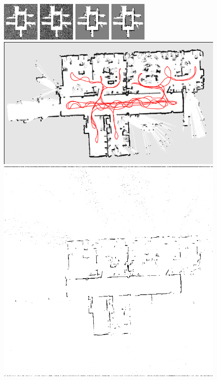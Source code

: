 \documentclass[letterpaper, 10 pt, conference]{ieeeconf} %
\begin{document}
\begin{figure}
  \includegraphics[width=0.16\textwidth]{../../Data/hospital_player/SICKSlowMetropolis.png}%
  \includegraphics[width=0.16\textwidth]{../../Data/hospital_player/SICKDDMCMC.png}%
  \includegraphics[width=0.16\textwidth]{../../Data/hospital_player/run_belief_propagation.png}%
  \includegraphics[width=0.16\textwidth]{../../Data/hospital_player/dualdecomposition.png}\\
  \includegraphics[height=0.16\textwidth,                                   angle=90]{../../Data/albertb.sm/path.png}%
  \includegraphics[height=0.16\textwidth, trim=65px 125px 20px 175px, clip, angle=90]{../../Data/albertb.sm/TwoAssumptionAlgo.png}%

\end{figure}
\end{document}
